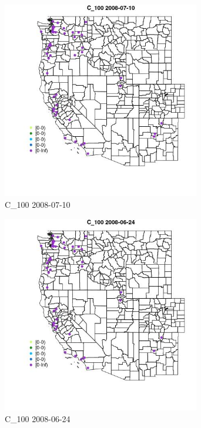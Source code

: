 \begin{figure} 
\centering  
\includegraphics[width=0.77\textwidth]{Code_Outputs/Report_ML_input_PM25_Step4_part_e_de_duplicated_aves_MapObsC_1002008-07-10.jpg} 
\caption{\label{fig:Report_ML_input_PM25_Step4_part_e_de_duplicated_avesMapObsC_1002008-07-10}C_100 2008-07-10} 
\end{figure} 
 

\begin{figure} 
\centering  
\includegraphics[width=0.77\textwidth]{Code_Outputs/Report_ML_input_PM25_Step4_part_e_de_duplicated_aves_MapObsC_1002008-06-24.jpg} 
\caption{\label{fig:Report_ML_input_PM25_Step4_part_e_de_duplicated_avesMapObsC_1002008-06-24}C_100 2008-06-24} 
\end{figure} 
 

